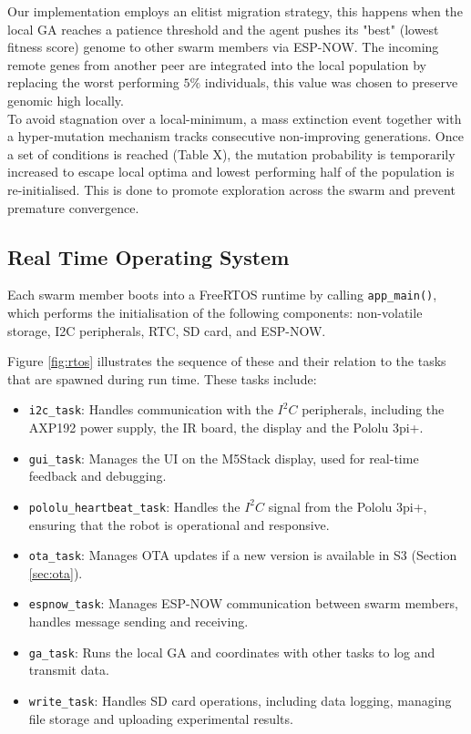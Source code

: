 \documentclass[conference]{IEEEtran}
\begin{document}
Our implementation employs an elitist migration strategy, this happens when the local GA reaches a patience threshold and the agent pushes its "best" (lowest fitness score) genome to other swarm members via ESP-NOW. The incoming remote genes from another peer are integrated into the local population by replacing the worst performing $5\%$ individuals, this value was chosen to preserve genomic high locally.\\ 

To avoid stagnation over a local-minimum, a mass extinction event together with a hyper-mutation mechanism tracks consecutive non-improving generations. Once a set of conditions is reached (Table X), the mutation probability is temporarily increased to escape local optima and lowest performing half of the population is re-initialised. This is done to promote exploration across the swarm and prevent premature convergence. 

\subsection{Real Time Operating System}

Each swarm member boots into a FreeRTOS runtime by calling \texttt{app\_main()}, which performs the initialisation of the following components: non-volatile storage, I2C peripherals, RTC, SD card, and ESP-NOW.

Figure \ref{fig:rtos} illustrates the sequence of these and their relation to the tasks that are spawned during run time. These tasks include:

\begin{itemize}
  \item \texttt{i2c\_task}: Handles communication with the $I^2C$ peripherals, including the AXP192 power supply, the IR board, the display and the Pololu 3pi+.
  \item \texttt{gui\_task}: Manages the UI on the M5Stack display, used for real-time feedback and debugging.
  \item \texttt{pololu\_heartbeat\_task}: Handles the $I^2C$ signal from the Pololu 3pi+, ensuring that the robot is operational and responsive.
  \item \texttt{ota\_task}: Manages OTA updates if a new version is available in S3 (Section \ref{sec:ota}).
  \item \texttt{espnow\_task}: Manages ESP-NOW communication between swarm members, handles message sending and receiving.
  \item \texttt{ga\_task}: Runs the local GA and coordinates with other tasks to log and transmit data.
  \item \texttt{write\_task}: Handles SD card operations, including data logging, managing file storage and uploading experimental results.
\end{itemize}
\end{document}
